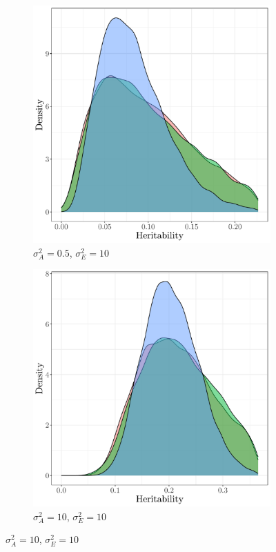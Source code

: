 \begin{figure}[H]
\begin{subfigure}{0.49\textwidth}
    \end{subfigure}
    \begin{subfigure}{0.49\textwidth}
        \caption{$\sigma^2_A=0.5$, $\sigma^2_E=10$}
        \includegraphics[width=\linewidth]{figures/overdispersion_vE-vA_10-0.5.pdf}
    \end{subfigure}
    \begin{subfigure}{0.49\textwidth}
        \caption{$\sigma^2_A=10$, $\sigma^2_E=10$}
        \includegraphics[width=\linewidth]{figures/overdispersion_vE-vA_10-10.pdf}

\end{subfigure}
\end{figure}
